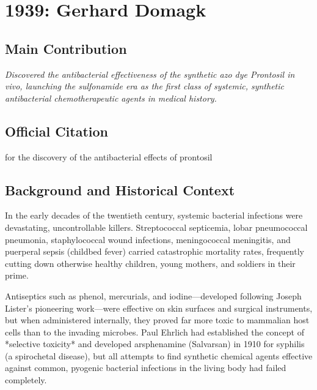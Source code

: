 \chapter[1939 --- Domagk]{1939: Gerhard Domagk}
\label{ch:1939_gerharddomagk}

\section*{Main Contribution}

\textit{Discovered the antibacterial effectiveness of the synthetic azo dye Prontosil in vivo, launching the sulfonamide era as the first class of systemic, synthetic antibacterial chemotherapeutic agents in medical history.}\cite{nobel-1939,lecture-1939,prontosil-history,lesch-miracle-drugs}

\section{Official Citation}

for the discovery of the antibacterial effects of prontosil

\section{Background and Historical Context}

In the early decades of the twentieth century, systemic bacterial infections were devastating, uncontrollable killers. Streptococcal septicemia, lobar pneumococcal pneumonia, staphylococcal wound infections, meningococcal meningitis, and puerperal sepsis (childbed fever) carried catastrophic mortality rates, frequently cutting down otherwise healthy children, young mothers, and soldiers in their prime. 

Antiseptics such as phenol, mercurials, and iodine—developed following Joseph Lister's pioneering work—were effective on skin surfaces and surgical instruments, but when administered internally, they proved far more toxic to mammalian host cells than to the invading microbes. Paul Ehrlich had established the concept of *selective toxicity* and developed arsphenamine (Salvarsan) in 1910 for syphilis (a spirochetal disease), but all attempts to find synthetic chemical agents effective against common, pyogenic bacterial infections in the living body had failed completely.

